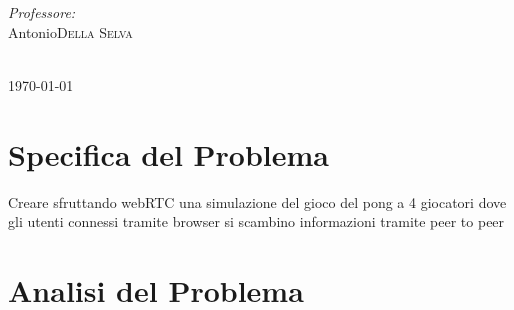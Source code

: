 \documentclass[11pt, a4paper, titlepage, block]{article}
\begin{document}
\begin{titlepage}
		\begin{minipage}{\textwidth}
			\begin{flushright}
				\emph{Professore:} \\
				 Antonio\textsc{Della Selva}\\ %
			\end{flushright}
		\end{minipage}\\[4cm]

		{\today}\\[1cm]



		\newpage
		\tableofcontents
		\newpage

	\end{titlepage}

	\section{Specifica del Problema}
Creare sfruttando webRTC una simulazione del gioco del pong a 4 giocatori dove gli utenti connessi tramite browser si scambino informazioni tramite peer to peer

	\section{Analisi del Problema}
\end{document}
